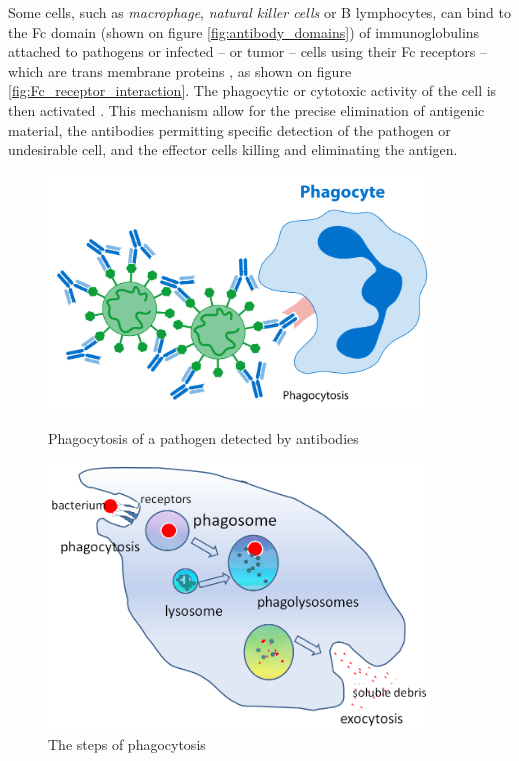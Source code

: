 Some cells, such as \emph{macrophage}, \emph{natural killer cells} or B lymphocytes, 
can bind to the Fc domain (shown on figure \ref{fig:antibody_domains})
of immunoglobulins attached to pathogens or infected -- or tumor -- cells
using their Fc receptors -- which are trans membrane proteins \cite{fridman_fc_1991}, 
as shown on figure \ref{fig:Fc_receptor_interaction}. 
The phagocytic or cytotoxic activity of the cell is then activated \cite{tay_antibody-dependent_2019}.
This mechanism allow for the precise elimination of antigenic material, the antibodies
permitting specific detection of the pathogen or undesirable cell, and the effector cells
killing and eliminating the antigen.

\begin{figure}[H]
    \begin{minipage}{0.49\textwidth}
        \centering
        \includegraphics[width=0.9\textwidth]{../Images/phagocytosis.png}   
        \caption{Phagocytosis of a pathogen detected by antibodies}
        \label{fig:phagocytosis}
    \end{minipage}\hfill
    \begin{minipage}{0.49\textwidth}
        \centering
        \includegraphics[width=0.9\textwidth]{../Images/phagocytosis_steps.png}   
        \caption{The steps of phagocytosis}
        \label{fig:phagocytosis_steps}
    \end{minipage}
\end{figure}


